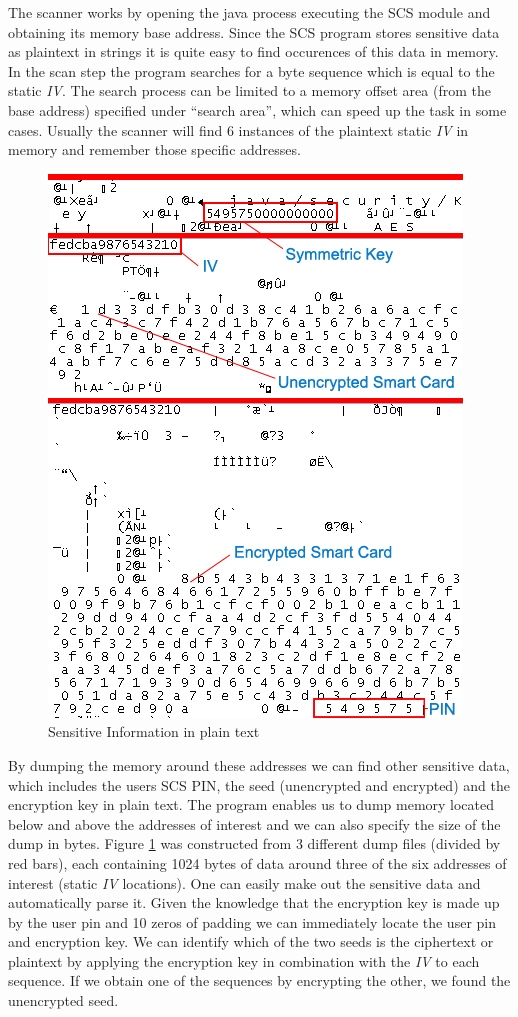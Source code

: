 \documentclass{llncs}
\begin{document}
The scanner works by opening the java process executing the SCS module and obtaining its memory base address. Since the SCS program stores sensitive data as plaintext in strings it is quite easy to find occurences of this data in memory. In the scan step the program searches for a byte sequence which is equal to the static \emph{IV}. The search process can be limited to a memory offset area (from the base address) specified under ``search area'', which can speed up the task in some cases. Usually the scanner will find 6 instances of the plaintext static \emph{IV} in memory and remember those specific addresses.
\begin{center}
\begin{figure}[hbtp]
        \centering
        \includegraphics[scale=0.6]{dump.png}
        \caption{Sensitive Information in plain text}\label{figDump}
\end{figure}
\end{center}
By dumping the memory around these addresses we can find other sensitive data, which includes the users SCS PIN, the seed (unencrypted and encrypted) and the encryption key in plain text. The program enables us to dump memory located below and above the addresses of interest and we can also specify the size of the dump in bytes. Figure \ref{figDump} was constructed from 3 different dump files (divided by red bars), each containing 1024 bytes of data around three of the six addresses of interest (static \emph{IV} locations). One can easily make out the sensitive data and automatically parse it. Given the knowledge that the encryption key is made up by the user pin and 10 zeros of padding we can immediately locate the user pin and encryption key. We can identify which of the two seeds is the ciphertext or plaintext by applying the encryption key in combination with the \emph{IV} to each sequence. If we obtain one of the sequences by encrypting the other, we found the unencrypted seed.
\end{document}
